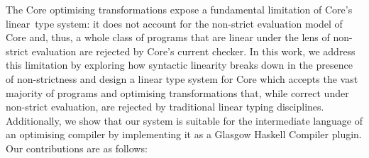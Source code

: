 \documentclass[acmsmall,review,screen]{acmart}
\newcommand{\ROUNDTWO}[1]{{\color{red}#1}}
\begin{document}
The Core optimising transformations expose a fundamental limitation of Core's
\ROUNDTWO{linear} type system: it does not account for the non-strict evaluation model
of Core and, thus, a whole class of programs that are linear under the lens of
non-strict evaluation are rejected by Core's current \ROUNDTWO{checker}.
%
In this work, we address this limitation by exploring how syntactic linearity
breaks down in the presence of non-strictness and design a linear type
system for Core which accepts the vast majority of programs and optimising
transformations that, while correct under non-strict evaluation, are rejected
by traditional linear typing disciplines.
%
%
Additionally, we show \ROUNDTWO{that} our system
%
is suitable for the intermediate language of an
optimising compiler by implementing it as a Glasgow Haskell Compiler plugin.
%
Our contributions are as follows:
%
\end{document}
